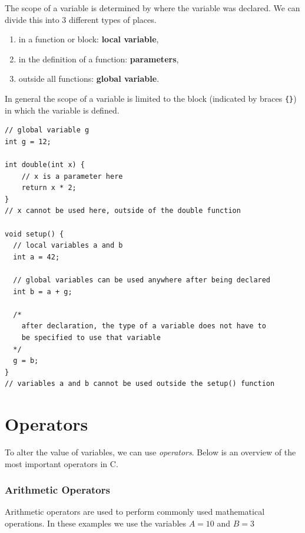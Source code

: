 \documentclass[11pt,fleqn]{book} %
\def\Cpp{{C\nolinebreak[4]\hspace{-.05em}\raisebox{.4ex}{\tiny\bf ++}}}
\begin{document}
\noindent
The scope of a variable is determined by where the variable was declared. We can divide this into 3 different types of places.\\

\begin{enumerate}
	\item in a function or block: \textbf{local variable},
	\item in the definition of a function: \textbf{parameters},
	\item outside all functions: \textbf{global variable}.
\end{enumerate}

\noindent
In general the scope of a variable is limited to the block (indicated by braces \texttt {\{\}}) in which the variable is defined.

\begin{example}
	\phantom{ }
	\begin{verbatim}
// global variable g
int g = 12;

int double(int x) {
	// x is a parameter here
	return x * 2;
}
// x cannot be used here, outside of the double function

void setup() {
  // local variables a and b
  int a = 42;

  // global variables can be used anywhere after being declared
  int b = a + g;

  /*
    after declaration, the type of a variable does not have to
    be specified to use that variable
  */
  g = b;
}
// variables a and b cannot be used outside the setup() function
	\end{verbatim}
\end{example}

\section{Operators}
To alter the value of variables, we can use \emph{operators}. Below is an overview of the most important operators in \Cpp.

\subsubsection{Arithmetic Operators}

Arithmetic operators are used to perform commonly used mathematical operations.
In these examples we use the variables $ A = 10 $ and $ B = 3 $
\end{document}
